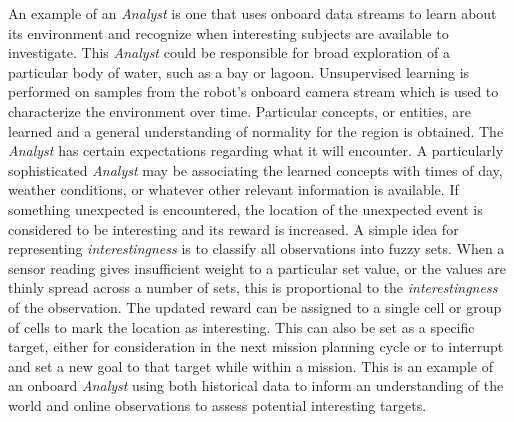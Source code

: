 \documentclass{tamuccthesis}
\begin{document}
An example of an \textit{Analyst} is one that uses onboard data streams to learn about its environment and recognize when interesting subjects are available to investigate. This \textit{Analyst} could be responsible for broad exploration of a particular body of water, such as a bay or lagoon. Unsupervised learning is performed on samples from the robot's onboard camera stream which is used to characterize the environment over time. Particular concepts, or entities, are learned and a general understanding of normality for the region is obtained. The \textit{Analyst} has certain expectations regarding what it will encounter. A particularly sophisticated \textit{Analyst} may be associating the learned concepts with times of day, weather conditions, or whatever other relevant information is available. If something unexpected is encountered, the location of the unexpected event is considered to be interesting and its reward is increased. A simple idea for representing \textit{interestingness} is to classify all observations into fuzzy sets. When a sensor reading gives insufficient weight to a particular set value, or the values are thinly spread across a number of sets, this is proportional to the \textit{interestingness} of the observation. The updated reward can be assigned to a single cell or group of cells to mark the location as interesting. This can also be set as a specific target, either for consideration in the next mission planning cycle or to interrupt and set a new goal to that target while within a mission. This is an example of an onboard \textit{Analyst} using both historical data to inform an understanding of the world and online observations to assess potential interesting targets. 
\end{document}
